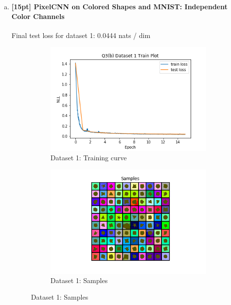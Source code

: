 \documentclass{article}
\begin{document}
\begin{enumerate}[(a)]
\newpage

\item {\bf [15pt] PixelCNN on Colored Shapes and MNIST: Independent Color Channels} \\\\
Final test loss for dataset 1: 0.0444  nats / dim
\begin{figure}[H]
    \centering
    \begin{subfigure}{0.45\textwidth}
        \centering
        \includegraphics[width=\textwidth]{figures/q3_b_dset1_train_plot.png}
        \caption{Dataset 1: Training curve}
    \end{subfigure}
    \hspace{0.2in}
    \begin{subfigure}{0.45\textwidth}
        \centering
        \includegraphics[width=\textwidth]{figures/q3_b_dset1_samples.png}
        \caption{Dataset 1: Samples}

\end{subfigure}
\end{figure}
\end{enumerate}
\end{document}

